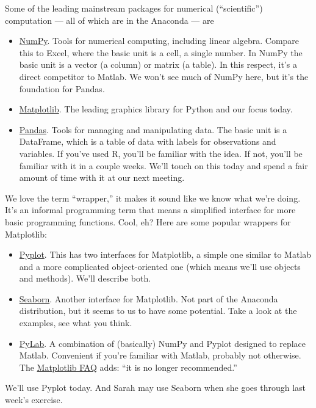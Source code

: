 \documentclass[11pt]{article}
\begin{document}
Some of the leading mainstream packages for numerical (``scientific'') computation ---
 all of which are in the Anaconda --- are
\begin{itemize}
\item \href{http://www.numpy.org/}{NumPy}.
Tools for numerical computing, including linear algebra.
Compare this to Excel, where the basic unit is a cell, a single number.
In NumPy the basic unit is a vector (a column) or matrix (a table).
In this respect, it's a direct competitor to Matlab.
We won't see much of NumPy here, but it's the foundation for Pandas.

\item \href{http://matplotlib.org/index.html}{Matplotlib}.
The leading graphics library for Python and our focus today.

\item \href{http://pandas.pydata.org/}{Pandas}.
Tools for managing and manipulating data.
The basic unit is a DataFrame, which is a table of data with labels
for observations and variables.
If you've used R, you'll be familiar with the idea.
If not, you'll be familiar with it in a couple weeks.
We'll touch on this today and spend a fair amount of time with it at
our next meeting.
\end{itemize}

We love the term ``wrapper,'' it makes it sound like we know what we're doing.
It's an informal programming term that means a simplified interface
for more basic programming functions. Cool, eh?
Here are some popular wrappers for Matplotlib:
\begin{itemize}
\item \href{http://matplotlib.org/users/pyplot_tutorial.html}{Pyplot}.
This has two interfaces for Matplotlib,
a simple one similar to Matlab and a more complicated object-oriented one
(which means we'll use objects and methods).
We'll describe both.

\item \href{http://web.stanford.edu/~mwaskom/software/seaborn/}{Seaborn}.
Another interface for Matplotlib.  Not part of the Anaconda distribution,
but it seems to us to have some potential.
Take a look at the examples, see what you think.

\item \href{http://wiki.scipy.org/PyLab}{PyLab}.
A combination of (basically) NumPy and Pyplot designed to replace Matlab.
Convenient if you're familiar with Matlab, probably not otherwise.
The
\href{http://matplotlib.org/dev/faq/usage_faq.html#matplotlib-pylab-and-pyplot-how-are-they-related}
{Matplotlib FAQ}
adds:  ``it is no longer recommended.''

\end{itemize}
We'll use Pyplot today.
And Sarah may use Seaborn when she goes through last week's exercise.
\end{document}
